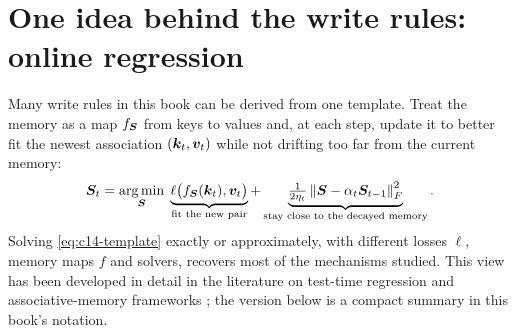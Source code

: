 \section{One idea behind the write rules: online regression}\label{sec:c14-regression}

Many write rules in this book can be derived from one template. Treat the memory as a map
$f_{\bm{S}}$ from keys to values and, at each step, update it to better fit the newest
association $(\bm{k}_t,\bm{v}_t)$ while not drifting too far from the current memory:
\begin{equation}\label{eq:c14-template}
  \bm{S}_t = \operatorname*{arg\,min}_{\bm{S}}\;
  \underbrace{\ell\big(f_{\bm{S}}(\bm{k}_t), \bm{v}_t\big)}_{\text{fit the new pair}}
  + \underbrace{\tfrac{1}{2\eta_t}\left\lVert \bm{S} - \alpha_t\bm{S}_{t-1}\right\rVert_F^2}_{\text{stay close to the decayed memory}} .
\end{equation}
Solving \eqref{eq:c14-template} exactly or approximately, with different losses $\ell$, memory
maps $f$ and solvers, recovers most of the mechanisms studied. This view has been developed in
detail in the literature on test-time regression and associative-memory frameworks
\citep{c02-wang2025regression,c02-behrouz2025miras}; the version below is a compact
summary in this book's notation.

